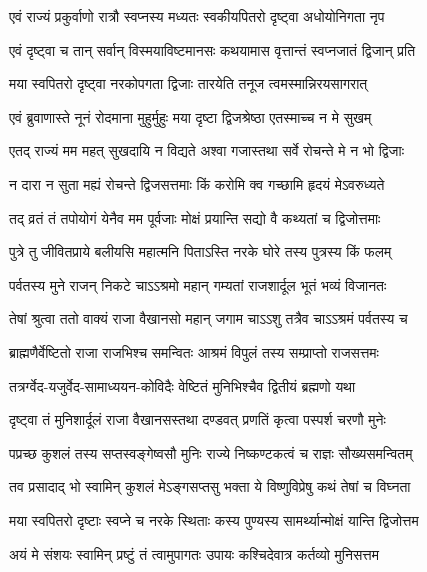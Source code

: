 \twolineshloka
{एवं राज्यं प्रकुर्वाणो रात्रौ स्वप्नस्य मध्यतः}
{स्वकीयपितरो दृष्ट्वा अधोयोनिगता नृप}%

\twolineshloka
{एवं दृष्ट्वा च तान् सर्वान् विस्मयाविष्टमानसः}
{कथयामास वृत्तान्तं स्वप्नजातं द्विजान् प्रति}%


\twolineshloka
{मया स्वपितरो दृष्ट्वा नरकोपगता द्विजाः}
{तारयेति तनूज त्वमस्मान्निरयसागरात्}%

\twolineshloka
{एवं ब्रुवाणास्ते नूनं रोदमाना मुहुर्मुहुः}
{मया दृष्टा द्विजश्रेष्ठा एतस्माच्च न मे सुखम्}%

\twolineshloka
{एतद् राज्यं मम महत् सुखदायि न विद्यते}
{अश्वा गजास्तथा सर्वे रोचन्ते मे न भो द्विजाः}%

\twolineshloka
{न दारा न सुता मह्यं रोचन्ते द्विजसत्तमाः}
{किं करोमि क्व गच्छामि हृदयं मेऽवरुध्यते}%

\twolineshloka
{तद् व्रतं तं तपोयोगं येनैव मम पूर्वजाः}
{मोक्षं प्रयान्ति सद्यो वै कथ्यतां च द्विजोत्तमाः}%

\twolineshloka
{पुत्रे तु जीवितप्राये बलीयसि महात्मनि}
{पिताऽस्ति नरके घोरे तस्य पुत्रस्य किं फलम्}%


\twolineshloka
{पर्वतस्य मुने राजन् निकटे चाऽऽश्रमो महान्}
{गम्यतां राजशार्दूल भूतं भव्यं विजानतः}%

\twolineshloka
{तेषां श्रुत्वा ततो वाक्यं राजा वैखानसो महान्}
{जगाम चाऽऽशु तत्रैव चाऽऽश्रमं पर्वतस्य च}%

\twolineshloka
{ब्राह्मणैर्वेष्टितो राजा राजभिश्च समन्वितः}
{आश्रमं विपुलं तस्य सम्प्राप्तो राजसत्तमः}%

\twolineshloka
{तत्रर्ग्वेद-यजुर्वेद-सामाध्ययन-कोविदैः}
{वेष्टितं मुनिभिश्चैव द्वितीयं ब्रह्मणो यथा}%

\twolineshloka
{दृष्ट्वा तं मुनिशार्दूलं राजा वैखानसस्तथा}
{दण्डवत् प्रणतिं कृत्वा पस्पर्श चरणौ मुनेः}%

\twolineshloka
{पप्रच्छ कुशलं तस्य सप्तस्वङ्गेष्वसौ मुनिः}
{राज्ये निष्कण्टकत्वं च राज्ञः सौख्यसमन्वितम्}%


\twolineshloka
{तव प्रसादाद् भो स्वामिन् कुशलं मेऽङ्गसप्तसु}
{भक्ता ये विष्णुविप्रेषु कथं तेषां च विघ्नता}%

\twolineshloka
{मया स्वपितरो दृष्टाः स्वप्ने च नरके स्थिताः}
{कस्य पुण्यस्य सामर्थ्यान्मोक्षं यान्ति द्विजोत्तम}%

\twolineshloka
{अयं मे संशयः स्वामिन् प्रष्टुं तं त्वामुपागतः}
{उपायः कश्चिदेवात्र कर्तव्यो मुनिसत्तम}%

